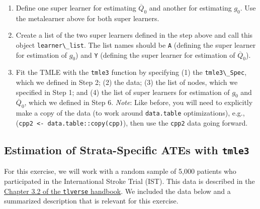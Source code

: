 \documentclass[
  12pt, krantz2,
]{book}
\newcommand{\passthrough}[1]{#1}
\providecommand{\tightlist}{%
  \setlength{\itemsep}{0pt}\setlength{\parskip}{0pt}}
\theoremstyle{definition}
\theoremstyle{definition}
\theoremstyle{definition}
\newcommand{\1}{\mathbbm{1}}
\begin{document}
\begin{enumerate}
\def\labelenumi{\arabic{enumi}.}
\setcounter{enumi}{4}
\tightlist
\item
  Define one super learner for estimating \(\overline{Q}_0\) and another for
  estimating \(g_0\). Use the metalearner above for both super learners.
\item
  Create a list of the two super learners defined in the step above and call
  this object \passthrough{\lstinline!learner\_list!}. The list names should be \passthrough{\lstinline!A!} (defining the super
  learner for estimation of \(g_0\)) and \passthrough{\lstinline!Y!} (defining the super learner for
  estimation of \(\overline{Q}_0\)).
\item
  Fit the TMLE with the \passthrough{\lstinline!tmle3!} function by specifying (1) the \passthrough{\lstinline!tmle3\_Spec!},
  which we defined in Step 2; (2) the data; (3) the list of nodes, which we
  specified in Step 1; and (4) the list of super learners for estimation of
  \(g_0\) and \(\overline{Q}_0\), which we defined in Step 6. \emph{Note}: Like before,
  you will need to explicitly make a copy of the data (to work around
  \passthrough{\lstinline!data.table!} optimizations), e.g., (\passthrough{\lstinline!cpp2 <- data.table::copy(cpp)!}), then
  use the \passthrough{\lstinline!cpp2!} data going forward.
\end{enumerate}

\hypertarget{tmle3-ex2}{%
\subsection{\texorpdfstring{Estimation of Strata-Specific ATEs with \texttt{tmle3}}{Estimation of Strata-Specific ATEs with tmle3}}\label{tmle3-ex2}}

For this exercise, we will work with a random sample of 5,000 patients who
participated in the International Stroke Trial (IST). This data is described in
the \protect\hyperlink{ist}{Chapter 3.2 of the \passthrough{\lstinline!tlverse!} handbook}. We included the data below
and a summarized description that is relevant for this exercise.
\end{document}
